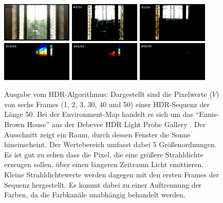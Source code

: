   
   \begin{figure}[h]
    \centering
    \includegraphics[width=0.3\textwidth]{../graphics/hdr_beleuchtung/ennis_frame_0_small.png}
    \includegraphics[width=0.3\textwidth]{../graphics/hdr_beleuchtung/ennis_frame_1_small.png}
    \includegraphics[width=0.3\textwidth]{../graphics/hdr_beleuchtung/ennis_frame_2_small.png}
    \includegraphics[width=0.3\textwidth]{../graphics/hdr_beleuchtung/ennis_frame_29_small.png}
    \includegraphics[width=0.3\textwidth]{../graphics/hdr_beleuchtung/ennis_frame_39_small.png}
    \includegraphics[width=0.3\textwidth]{../graphics/hdr_beleuchtung/ennis_frame_49_small.png}
    \caption[HDR-Frames: Echte Szene]{Ausgabe vom HDR-Algorithmus: Dargestellt sind die Pixelwerte ($V$) von sechs Frames (1, 2, 3, 30, 40 und 50) einer HDR-Sequenz der Länge 50. 
    Bei der Environment-Map handelt es sich um das ``Ennis-Brown House'' aus der Debevec HDR Light Probe Gallery \cite{lightprobe_gallery}. 
    Der Ausschnitt zeigt ein Raum, durch dessen Fenster die Sonne hineinscheint. Der Wertebereich umfasst dabei 5 Größenordnungen.
    Es ist gut zu sehen dass die Pixel, die eine größere Strahldichte erzeugen sollen, über einen längeren Zeitraum Licht emittieren. 
    Kleine Strahldichtewerte werden dagegen mit den ersten Frames der Sequenz hergestellt. 
    Es kommt dabei zu einer Auftrennung der Farben, da die Farbkanäle unabhängig behandelt werden.
    }
    \label{fig:hdr_frames_example}
   \end{figure}
   
